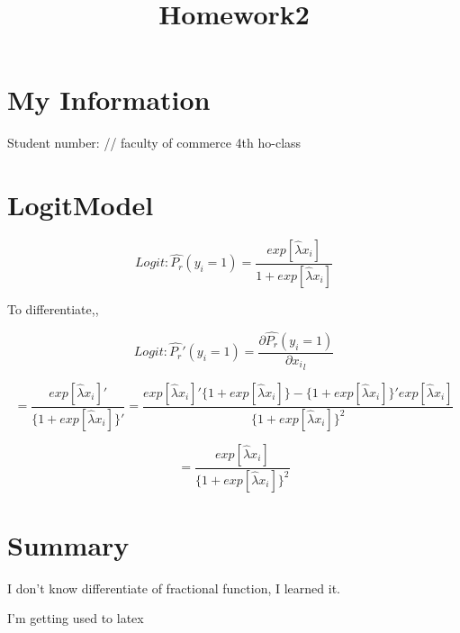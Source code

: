 \documentclass[dvipdfmx]{jsarticle}
\begin{document}
\title{Homework2}
\author{}
\maketitle

\section{My Information}
Student number: 
//
faculty of commerce 4th
ho-class
\section{LogitModel}


\begin{equation}
 Logit: \widehat{P_r}(y_i = 1) = \frac{exp[\widehat{λ}x_i]}{1 + exp[\widehat{λ}x_i]}
\end{equation}

To differentiate,,

\begin{equation}
  Logit: \widehat{P_r}'(y_i = 1) = \frac{\partial{\widehat{P_r}(y_i = 1)}}{\partial{{x_i}_l}}
\end{equation}

\begin{equation}
  = \frac{exp[\widehat{λ}x_i]'}{\{ 1 + exp[\widehat{λ}x_i]\}'}  = \frac{exp[\widehat{λ}x_i]'\{ 1 + exp[\widehat{λ}x_i]\} - \{ 1 + exp[\widehat{λ}x_i]\}'exp[\widehat{λ}x_i]}{\{ 1 + exp[\widehat{λ}x_i]\}^2}
\end{equation}


\begin{equation}
  = \frac{exp[\widehat{λ}x_i]}{\{ 1 + exp[\widehat{λ}x_i]\}^2}
\end{equation}

\section{Summary}

I don't know differentiate of fractional function, I learned it.

I'm getting used to latex
\end{document}
